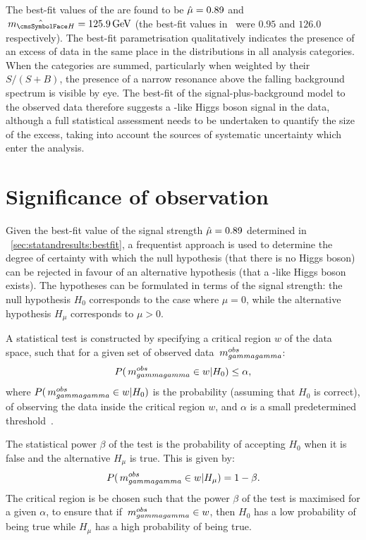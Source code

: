 The best-fit values of the \POI\s are found to be $\hat{\mu}=0.89$ and $\hat{\mH}= \bestFitGlobalMH\GeV$ (the best-fit values in~\cite{CMS-PAS-HIG-16-020} were $0.95$ and $126.0$ respectively). The best-fit parametrisation qualitatively indicates the presence of an excess of data in the same place in the \mgg distributions in all analysis categories. When the categories are summed, particularly when weighted by their $S/(S+B)$, the presence of a narrow resonance above the falling background spectrum is visible by eye. The best-fit of the signal-plus-background model to the observed data therefore suggests a \SM-like Higgs boson signal in the data, although a full statistical assessment needs to be undertaken to quantify the size of the excess, taking into account the sources of systematic uncertainty which enter the analysis. 


\section{Significance of observation}
\label{sec:statandresults:significance}

Given the best-fit value of the signal strength $\hat{\mu}= 0.89$ determined in \Sec~\ref{sec:statandresults:bestfit}, a frequentist approach is used to determine the degree of certainty with which the null hypothesis (that there is no Higgs boson) can be rejected in favour of an alternative hypothesis (that a \SM-like Higgs boson exists). The hypotheses can be formulated in terms of the signal strength: the null hypothesis $H_{0}$ corresponds to the case where $\mu=0$, while the alternative hypothesis $H_{\mu}$ corresponds to $\mu > 0$. 

A statistical test is constructed by specifying a critical region $w$ of the data space, such that for a given set of observed data $\,m_{gammagamma}^{obs}$:
\begin{equation}
P(\,m_{gammagamma}^{obs} \in w | H_{0} ) \leq \alpha,
\end{equation}
where $P(\,m_{gammagamma}^{obs} \in w | H_{0} ) $ is the probability (assuming that $H_{0}$ is correct), of observing the data inside the critical region $w$, and $\alpha$ is a small predetermined threshold~\cite{Cowan}. 

The statistical power $\beta$ of the test is the probability of accepting $H_{0}$ when it is false and the alternative $H_{\mu} $ is true. This is given by:
\begin{equation}
P(\,m_{gammagamma}^{obs} \in w | H_{\mu} ) = 1 - \beta.
\end{equation}
The critical region is be chosen such that the power $\beta$ of the test is maximised for a given $\alpha$, to ensure that if $\,m_{gammagamma}^{obs} \in w$, then $H_{0}$ has a low probability of being true while $H_{\mu}$ has a high probability of being true. 

